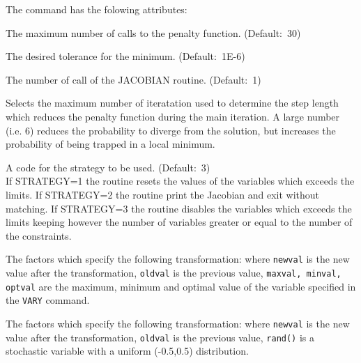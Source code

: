 The command has the folowing attributes: 
\begin{madlist}
   The maximum number of calls to the penalty
  function. (Default:~30)  

   The desired tolerance for the minimum. 
  (Default:~1E-6)

   The number of call of the JACOBIAN routine. 
  (Default:~1) 

   Selects the maximum number of iteratation used to
  determine the step length which reduces the penalty function during
  the main iteration. A large number (i.e. 6) reduces the probability
  to diverge from the solution, but increases the probability of being
  trapped in a local minimum.  

   A code for the strategy to be used. (Default:~3)\\
  If STRATEGY=1 the routine resets the values of the variables which
  exceeds the limits. If STRATEGY=2 the routine print the Jacobian
  and exit without matching. If STRATEGY=3 the routine  disables the
  variables which exceeds the limits keeping however the number of
  variables greater or equal to the number of the constraints.  

   The factors which specify the following
  transformation: 
  where \texttt{newval} is the new value after the transformation,
  \texttt{oldval} is the previous value, \texttt{maxval, minval,
    optval} are the maximum, minimum and optimal value of
   the variable specified in the \texttt{VARY} command. 

    The factors which specify the following transformation:
   where \texttt{newval} is the new value after the transformation,
   \texttt{oldval} is the previous value, \texttt{rand()} is a stochastic
   variable with a uniform (-0.5,0.5) distribution.   
\end{madlist} 




